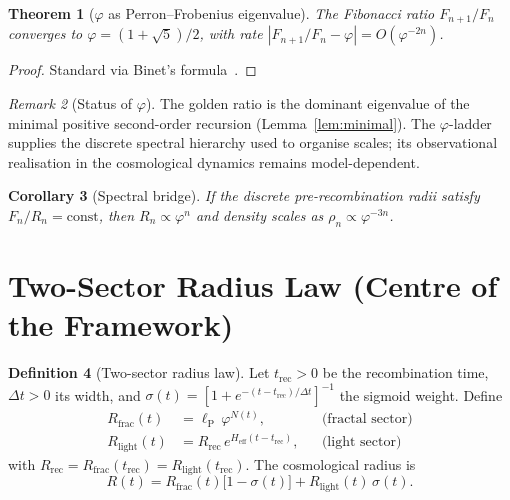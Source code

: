 \documentclass[12pt,a4paper]{amsart}
\theoremstyle{plain}
\newtheorem{theorem}{Theorem}[section]
\newtheorem{corollary}[theorem]{Corollary}
\theoremstyle{definition}
\newtheorem{definition}[theorem]{Definition}
\theoremstyle{remark}
\newtheorem{remark}[theorem]{Remark}
\newcommand{\vp}{\varphi}
\newcommand{\lP}{\ell_{\mathrm{P}}}
\newcommand{\Heff}{H_{\mathrm{eff}}}
\newcommand{\trec}{t_{\mathrm{rec}}}
\newcommand{\Rrec}{R_{\mathrm{rec}}}
\newcommand{\Rfrac}{R_{\mathrm{frac}}}
\newcommand{\Rlight}{R_{\mathrm{light}}}
\begin{document}
\begin{theorem}[$\varphi$ as Perron--Frobenius eigenvalue]
  \label{thm:phi}
  The Fibonacci ratio $F_{n+1}/F_n$ converges to $\vp=(1+\sqrt5)/2$,
  with rate $|F_{n+1}/F_n-\vp|=O(\vp^{-2n})$.
\end{theorem}

\begin{proof}
  Standard via Binet's formula~\cite{Hardy1979,Meyer2000}.
\end{proof}

\begin{remark}[Status of $\varphi$]
  The golden ratio is the dominant eigenvalue of the minimal positive
  second-order recursion (Lemma~\ref{lem:minimal}). The $\vp$-ladder
  supplies the discrete spectral hierarchy used to organise scales;
  its observational realisation in the cosmological dynamics remains
  model-dependent.
\end{remark}

\begin{corollary}[Spectral bridge]
  \label{cor:bridge}
  If the discrete pre-recombination radii satisfy $F_n/R_n=\mathrm{const}$,
  then $R_n\propto\vp^n$ and density scales as $\rho_n\propto\vp^{-3n}$.
\end{corollary}

\section{Two-Sector Radius Law (Centre of the Framework)}
\label{sec:twosector}

\begin{definition}[Two-sector radius law]
  \label{def:twosector}
  Let $\trec>0$ be the recombination time, $\Delta t>0$ its width,
  and $\sigma(t)=[1+e^{-(t-\trec)/\Delta t}]^{-1}$ the sigmoid weight.
  Define
  \begin{align}
    \Rfrac(t)  &= \lP\,\vp^{N(t)},
      &&\text{(fractal sector)}\label{eq:Rfrac}\\
    \Rlight(t) &= \Rrec\,e^{\Heff(t-\trec)},
      &&\text{(light sector)}\label{eq:Rlight}
  \end{align}
  with $\Rrec=\Rfrac(\trec)=\Rlight(\trec)$. The cosmological radius is
  \begin{equation}
    \boxed{
      R(t) = \Rfrac(t)\bigl[1-\sigma(t)\bigr] + \Rlight(t)\,\sigma(t).
    }
    \label{eq:twosector}
  \end{equation}
\end{definition}
\end{document}
